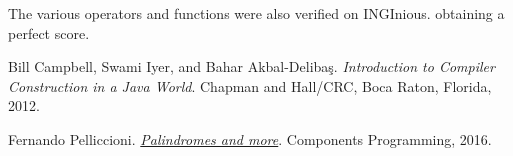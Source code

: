 \documentclass[11pt]{article}
\begin{document}
The various operators and functions were also verified on INGInious. obtaining a perfect score.

\begin{thebibliography}{9}
	Bill Campbell, Swami Iyer, and Bahar Akbal-Deliba\c s.
	\textit{Introduction to Compiler Construction in a Java World}.
	Chapman and Hall/CRC, Boca Raton, Florida, 2012.
	
	Fernando Pelliccioni.
	\href{http://componentsprogramming.com/palindromes/}{\textit{Palindromes and more}}.
	Components Programming, 2016.
\end{thebibliography}
\end{document}
